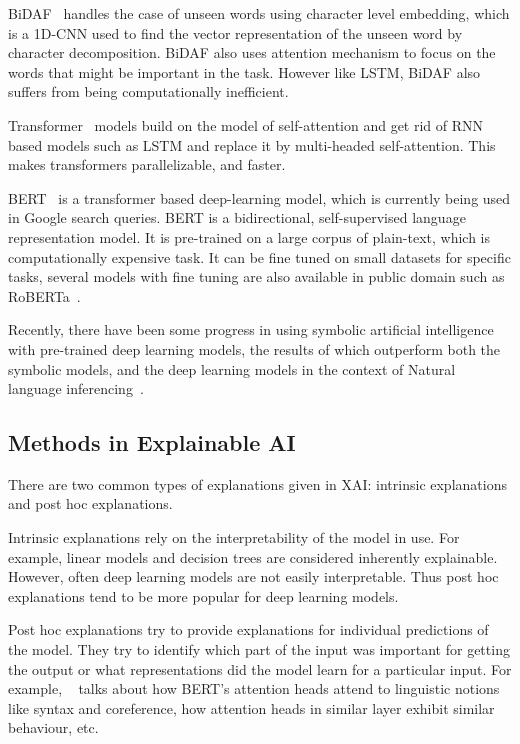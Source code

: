 \documentclass[10pt,twocolumn,letterpaper]{article}
\begin{document}
BiDAF~\cite{BiDAF} handles the case of unseen words using character level embedding, which is a 1D-CNN used to find the vector representation of the unseen word by character decomposition. BiDAF also uses attention mechanism to focus on the words that might be important in the task. However like LSTM, BiDAF also suffers from being computationally inefficient.

Transformer~\cite{Transformer} models build on the model of self-attention and get rid of RNN based models such as LSTM and replace it by multi-headed self-attention. This makes transformers parallelizable, and faster. 

BERT~\cite{BERT} is a transformer based deep-learning model, which is currently being used in Google search queries. BERT is a bidirectional, self-supervised language representation model. It is pre-trained on a large corpus of plain-text, which is computationally expensive task. It can be fine tuned on small datasets for specific tasks, several models with fine tuning are also available in public domain such as RoBERTa~\cite{RoBERTa}.

Recently, there have been some progress in using symbolic artificial intelligence with pre-trained deep learning models, the results of which outperform both the symbolic models, and the deep learning models in the context of Natural language inferencing~\cite{symbolic_deep_learning}.


\subsection{Methods in Explainable AI}
There are two common types of explanations given in XAI: intrinsic explanations and post hoc explanations.

Intrinsic explanations rely on the interpretability of the model in use. For example, linear models and decision trees are considered inherently explainable. However, often deep learning models are not easily interpretable. Thus post hoc explanations tend to be more popular for deep learning models. 


Post hoc explanations try to provide explanations for individual predictions of the model. They try to identify which part of the input was important for getting the output or what representations did the model learn for a particular input. For example, ~\cite{bert_attention} talks about how BERT's attention heads attend to linguistic notions like syntax and coreference, how attention heads in similar layer exhibit similar behaviour, etc.
\end{document}
